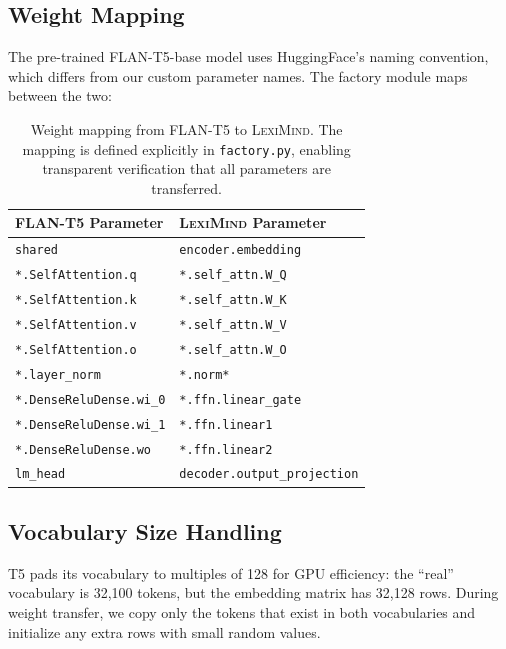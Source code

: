 \documentclass[11pt,a4paper]{article}
\newcommand{\lexiname}{\textsc{LexiMind}}
\newcommand{\tflant}{FLAN-T5}
\begin{document}
\subsection{Weight Mapping}

The pre-trained \tflant{}-base model uses HuggingFace's naming convention, which differs from our custom parameter names.
The factory module maps between the two:

\begin{table}[t]
\centering
\caption{Weight mapping from \tflant{} to \lexiname{}. The mapping is defined explicitly in \texttt{factory.py}, enabling transparent verification that all parameters are transferred.}
\label{tab:weight_mapping}
\small
\begin{tabular}{@{}ll@{}}
\toprule
\textbf{\tflant{} Parameter} & \textbf{\lexiname{} Parameter} \\
\midrule
\texttt{shared} & \texttt{encoder.embedding} \\
\texttt{*.SelfAttention.q} & \texttt{*.self\_attn.W\_Q} \\
\texttt{*.SelfAttention.k} & \texttt{*.self\_attn.W\_K} \\
\texttt{*.SelfAttention.v} & \texttt{*.self\_attn.W\_V} \\
\texttt{*.SelfAttention.o} & \texttt{*.self\_attn.W\_O} \\
\texttt{*.layer\_norm} & \texttt{*.norm*} \\
\texttt{*.DenseReluDense.wi\_0} & \texttt{*.ffn.linear\_gate} \\
\texttt{*.DenseReluDense.wi\_1} & \texttt{*.ffn.linear1} \\
\texttt{*.DenseReluDense.wo} & \texttt{*.ffn.linear2} \\
\texttt{lm\_head} & \texttt{decoder.output\_projection} \\
\bottomrule
\end{tabular}
\end{table}

\subsection{Vocabulary Size Handling}

T5 pads its vocabulary to multiples of 128 for GPU efficiency: the ``real'' vocabulary is 32{,}100 tokens, but the embedding matrix has 32{,}128 rows.
During weight transfer, we copy only the tokens that exist in both vocabularies and initialize any extra rows with small random values.
\end{document}
